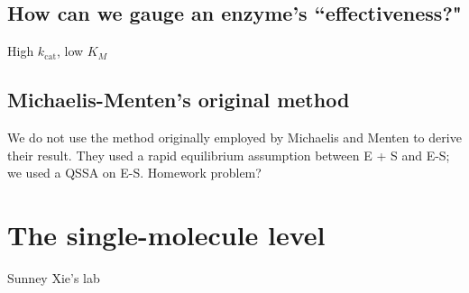 \documentclass{article}
\begin{document}
\subsection*{How can we gauge an enzyme's ``effectiveness?"}

High $k_{\textrm{cat}}$, low $K_M$

\subsection*{Michaelis-Menten's original method}

We do not use the method originally employed by Michaelis and Menten to derive their result. They used a rapid equilibrium assumption between E + S and E-S; we used a QSSA on E-S. Homework problem?

\section*{The single-molecule level}

Sunney Xie's lab
\end{document}
